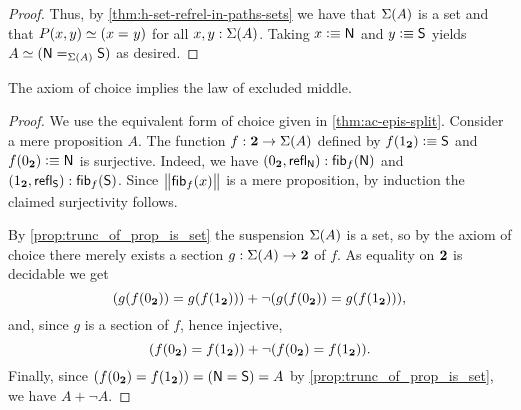 \begin{proof}
Thus, by \autoref{thm:h-set-refrel-in-paths-sets} we have that $\susp(A)$ is a set and that $P(x,y) \eqvsym (\id{x}{y})$ for all $x,y:\susp(A)$.
Taking $x\defeq \north$ and $y\defeq \south$ yields $\eqv{A}{(\id[\susp(A)]\north\south)}$ as desired.
\end{proof}

\begin{thm}[Diaconescu]\label{thm:1surj_to_surj_to_pem}
  The axiom of choice implies the law of excluded middle.
\end{thm}

\begin{proof}
We use the equivalent form of choice given in \autoref{thm:ac-epis-split}.
Consider a mere proposition $A$.
The function $f:\bool\to\susp(A)$ defined by
$f(\btrue) \defeq \south$ and $f(\bfalse) \defeq \north$
is surjective.
Indeed, we have
$\pairr{\bfalse,\refl{\north}} : \hfiber{f}{\north}$
and $\pairr{\btrue,\refl{\south}} :\hfiber{f}{\south}$.
Since $\bbrck{\hfiber{f}{x}}$ is a mere proposition, by induction the claimed surjectivity follows.

By \autoref{prop:trunc_of_prop_is_set} the suspension $\susp(A)$
is a set, so by the axiom of choice there merely exists a
section $g: \susp(A) \to \bool$ of $f$.
As equality on $\bool$ is decidable we get
\begin{equation*}
 (g(f(\bfalse))= g(f(\btrue))) +
 \lnot (g(f(\bfalse))= g(f(\btrue))),
\end{equation*}
and, since $g$ is a section of $f$, hence injective,
\begin{equation*}
(f(\bfalse) = f(\btrue)) +
\lnot (f(\bfalse) = f(\btrue)).
\end{equation*}
Finally, since $(f(\bfalse)=f(\btrue)) = (\north=\south) = A$ by \autoref{prop:trunc_of_prop_is_set}, we have $A+\neg A$.
\end{proof}




